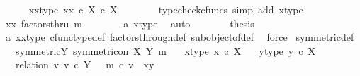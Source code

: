 \begin{isabellebody}
\ \ \ \ \isamarkupfalse%
\ xx{\isacharunderscore}{\kern0pt}type{\isacharcolon}{\kern0pt}\ {\isachardoublequoteopen}{\isasymlangle}x{\isacharcomma}{\kern0pt}x{\isasymrangle}\ {\isasymin}\isactrlsub c\ X\ {\isasymtimes}\isactrlsub c\ X{\isachardoublequoteclose}\isanewline
\ \ \ \ \ \ \isamarkupfalse%
\ {\isacharparenleft}{\kern0pt}typecheck{\isacharunderscore}{\kern0pt}cfuncs{\isacharcomma}{\kern0pt}\ simp\ add{\isacharcolon}{\kern0pt}\ x{\isacharunderscore}{\kern0pt}type{\isacharparenright}{\kern0pt}\isanewline
\ \ \ \ \isamarkupfalse%
\ {\isachardoublequoteopen}{\isasymlangle}x{\isacharcomma}{\kern0pt}x{\isasymrangle}\ factorsthru\ m{\isachardoublequoteclose}\isanewline
\ \ \ \ \ \ \isamarkupfalse%
\ a{}\ x{\isacharunderscore}{\kern0pt}type\ \isamarkupfalse%
\ auto\isanewline
\ \ \ \ \isamarkupfalse%
\ \isamarkupfalse%
\ {\isacharquery}{\kern0pt}thesis\isanewline
\ \ \ \ \ \ \isamarkupfalse%
\ a{}\ xx{\isacharunderscore}{\kern0pt}type\ cfunc{\isacharunderscore}{\kern0pt}type{\isacharunderscore}{\kern0pt}def\ factors{\isacharunderscore}{\kern0pt}through{\isacharunderscore}{\kern0pt}def\ subobject{\isacharunderscore}{\kern0pt}of{\isacharunderscore}{\kern0pt}def{}\ \isamarkupfalse%
\ force\isanewline
{}\isamarkupfalse%
%
\endisatagproof
{\isafoldproof}%
%
\isadelimproof
\isanewline
%
\endisadelimproof
\isanewline
{}\isamarkupfalse%
\ symmetric{\isacharunderscore}{\kern0pt}def{}{\isacharcolon}{\kern0pt}\isanewline
\ \ \ symmetric{\isacharunderscore}{\kern0pt}Y{\isacharcolon}{\kern0pt}\ {\isachardoublequoteopen}symmetric{\isacharunderscore}{\kern0pt}on\ X\ {\isacharparenleft}{\kern0pt}Y{\isacharcomma}{\kern0pt}\ m{\isacharparenright}{\kern0pt}{\isachardoublequoteclose}\isanewline
\ \ \ x{\isacharunderscore}{\kern0pt}type{\isacharcolon}{\kern0pt}\ {\isachardoublequoteopen}x\ {\isasymin}\isactrlsub c\ X{\isachardoublequoteclose}\isanewline
\ \ \ y{\isacharunderscore}{\kern0pt}type{\isacharcolon}{\kern0pt}\ {\isachardoublequoteopen}y\ {\isasymin}\isactrlsub c\ X{\isachardoublequoteclose}\isanewline
\ \ \ relation{\isacharcolon}{\kern0pt}\ {\isachardoublequoteopen}{\isasymexists}v{\isachardot}{\kern0pt}\ v\ {\isasymin}\isactrlsub c\ Y\ {\isasymand}\ \ m\ {\isasymcirc}\isactrlsub c\ v\ {\isacharequal}{\kern0pt}\ {\isasymlangle}x{\isacharcomma}{\kern0pt}y{\isasymrangle}{\isachardoublequoteclose}\isanewline

\end{isabellebody}
